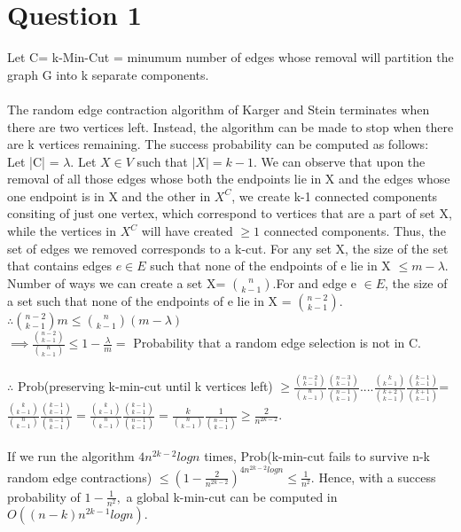 \documentclass[12pt]{article}
\title{\vspace{-6mm}{ Assignment-3}}
\author{Anannya Mathur 2023SIY7565}
\date{}
\begin{document}
\maketitle
\noindent
\vspace{-10mm}
\section{Question 1}

Let C= k-Min-Cut = minumum number of edges whose removal
will partition the graph G into k separate components. \\
\\
The random edge contraction algorithm of Karger and Stein
terminates when there are two vertices left. Instead, the 
algorithm can be made to stop when there are k vertices 
remaining. The success probability can be computed as 
follows: \\
Let |C| = $\lambda$. Let $X \in V $ such that $|X|=k-1.$ We 
can observe that upon the removal of all those edges whose both 
the endpoints lie in X and the edges whose one endpoint is in X 
and the other in $X^C$, we create k-1 connected components 
consiting of just one vertex, which correspond to vertices 
that are a part of set X, while
the vertices in $X^C$ will have created $\ge 1$ connected 
components. Thus, the set of edges we removed corresponds to
a k-cut. For any set X, the size of the set that contains edges 
$e \in E$ such that none of the endpoints of e lie in X 
$\le m- \lambda $. Number of ways we can create a set X=
$ {n} \choose {k-1}$.For and edge e $\in E$, the size of a set
such that none of the endpoints of e lie in X = ${n-2} 
\choose {k-1}$. $\therefore {{n-2} \choose {k-1}}m \le
{{n} \choose {k-1}}(m- \lambda)$
\\ 
$\implies \frac{{{n-2} 
\choose {k-1}}}{{{n} \choose {k-1}}} \le 1- \frac{\lambda}{m}=$ 
Probability that a random edge selection is not in C. \\
\\
$\therefore$ Prob(preserving k-min-cut until k vertices left)
$\ge \frac{{{n-2} 
\choose {k-1}}}{{{n} \choose {k-1}}} \frac{{{n-3} 
\choose {k-1}}}{{{n-1} \choose {k-1}}}....\frac{{{k} 
\choose {k-1}}}{{{k+2} \choose {k-1}}}\frac{{{k-1} 
\choose {k-1}}}{{{k+1} \choose {k-1}}}$= $\frac{{{k} 
\choose {k-1}}}{{{n} \choose {k-1}}}\frac{{{k-1} 
\choose {k-1}}}{{{n-1} \choose {k-1}}} = \frac{{{k} 
\choose {k-1}}}{{{n} \choose {k-1}}}\frac{{{k-1} 
\choose {k-1}}}{{{n-1} \choose {k-1}}}= \frac{k}{{{n} \choose {k-1}}}\frac{1}{{{n-1} \choose {k-1}}}
\ge \frac{2}{n^{2k-2}}.$ 
\\ \\
If we run the algorithm $4n^{2k-2}logn$ times, Prob(k-min-cut
fails to survive n-k random edge contractions) $\le (1-\frac{2}{n^{2k-2}})^{4n^{2k-2}logn}
\le \frac {1}{n^2}.$ Hence, with a success probability of 
$1- \frac{1}{n^2}, $ a global k-min-cut can be computed in 
$O((n-k)n^{2k-1}logn).$ \\
\end{document}
